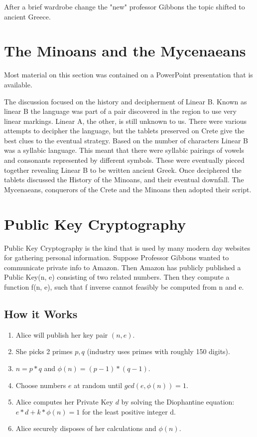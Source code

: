 After a brief wardrobe change the "new" professor Gibbons the topic shifted to ancient Greece.

\section{The Minoans and the Mycenaeans}
 Most material on this section was contained on a PowerPoint presentation that is available.
 
 The discussion focused on the history and decipherment of Linear B. Known as linear B the language was part of a pair discovered in the region to use very linear markings. Linear A, the other, is still unknown to us. There were various attempts to decipher the language, but the tablets preserved on Crete give the best clues to the eventual strategy. Based on the number of characters Linear B was a syllabic language. This meant that there were syllabic pairings of vowels and consonants represented by different symbols. These were eventually pieced together revealing Linear B to be written ancient Greek. Once deciphered the tablets discussed the History of the Minoans, and their eventual downfall. The Mycenaeans, conquerors of the Crete and the Minoans then adopted their script. 
 
 \section{Public Key Cryptography}
 Public Key Cryptography is the kind that is used by many modern day websites for gathering personal information. Suppose Professor Gibbons wanted to communicate private info to Amazon. Then Amazon has publicly published a Public Key(n, e) consisting of two related numbers. Then they compute a function f(n, e), such that f inverse cannot feasibly be computed from n and e. 
 
 \subsection{How it Works}
 \begin{enumerate}
 \item Alice will publish her key pair $(n, e)$.
 \item She picks 2 primes $p, q$ (industry uses primes with roughly 150 digits).
 \item $ n = p * q$ and $ \phi (n) = (p-1)*(q-1) $.
 \item Choose numbers $e$ at random until $gcd(e, \phi (n)) = 1$.
 \item Alice computes her Private Key $d$ by solving the Diophantine
 equation: $ e*d + k* \phi (n) = 1$ for the least positive integer d.
 \item Alice securely disposes of her calculations and $\phi (n)$.
 \end{enumerate}
 
